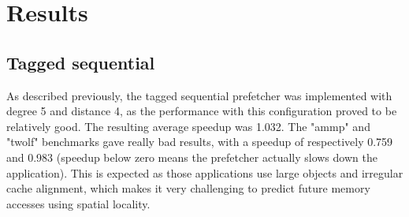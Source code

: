 \section{Results}

\subsection{Tagged sequential}
As described previously, the tagged sequential prefetcher was 
implemented with degree 5 and distance 4, as the performance 
with this configuration proved to be relatively good. The 
resulting average speedup was 1.032. The "ammp" and "twolf" benchmarks gave 
really bad results, with a speedup of respectively 0.759 and 0.983 
(speedup below zero means the prefetcher actually slows down the application). This is
expected as those applications use large objects and irregular cache alignment, 
which makes it very challenging to predict future memory accesses using spatial locality.

